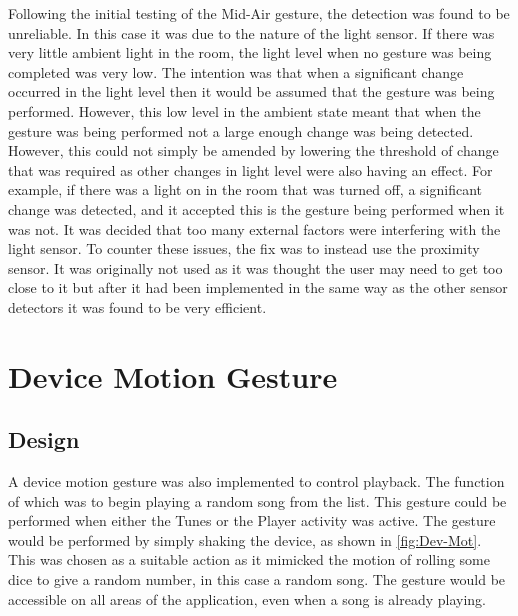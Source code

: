 \documentclass{l4proj}
\begin{document}
Following the initial testing of the Mid-Air gesture, the detection was found to be unreliable. In this case it was due to the nature of the light sensor. If there was very little ambient light in the room, the light level when no gesture was being completed was very low. The intention was that when a significant change occurred in the light level then it would be assumed that the gesture was being performed. However, this low level in the ambient state meant that when the gesture was being performed not a large enough change was being detected. However, this could not simply be amended by lowering the threshold of change that was required as other changes in light level were also having an effect. For example, if there was a light on in the room that was turned off, a significant change was detected, and it accepted this is the gesture being performed when it was not. It was decided that too many external factors were interfering with the light sensor. To counter these issues, the fix was to instead use the proximity sensor. It was originally not used as it was thought the user may need to get too close to it but after it had been implemented in the same way as the other sensor detectors it was found to be very efficient.


\section{Device Motion Gesture}

\subsection{Design}
A device motion gesture was also implemented to control playback. The function of which was to begin playing a random song from the list. This gesture could be performed when either the Tunes or the Player activity was active. The gesture would be performed by simply shaking the device, as shown in \autoref{fig:Dev-Mot}. This was chosen as a suitable action as it mimicked the motion of rolling some dice to give a random number, in this case a random song. The gesture would be accessible on all areas of the application, even when a song is already playing.
\end{document}
